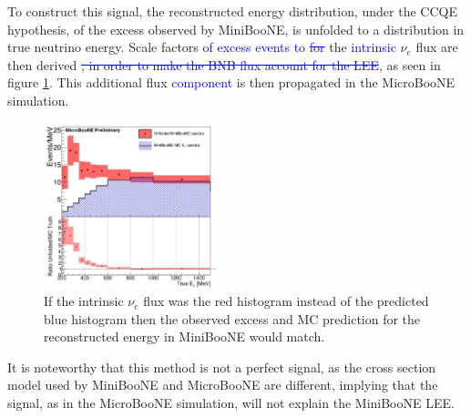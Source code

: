 \documentclass[a4paper]{article}
\newcommand{\nue}{$\nu_e$ }
\begin{document}
To construct this signal, the reconstructed energy distribution, under the CCQE hypothesis, of the excess observed by MiniBooNE, is unfolded to a distribution in true neutrino energy.
Scale factors \textcolor{blue}{of excess events to \st{for}} the \textcolor{blue}{intrinsic} \nue flux are then derived \textcolor{blue}{\st{, in order to make the BNB flux account for the LEE}}, as seen in figure \ref{fig:lee_unfolded_signal}.
This additional flux \textcolor{blue}{component} is then propagated in the MicroBooNE simulation.

\begin{figure}[]
    \begin{center}
    \includegraphics[width=0.45\textwidth]{Sensitivity/lee_unfolded_signal.png}
    \caption{If the intrinsic \nue flux was the red histogram instead of the predicted blue histogram then the observed excess and MC prediction for the reconstructed energy in MiniBooNE would match.}
    \label{fig:lee_unfolded_signal}
    \end{center}
\end{figure}

It is noteworthy that this method is not a perfect signal, as the cross section model used by MiniBooNE and MicroBooNE are different, implying that the signal, as in the MicroBooNE simulation, will not explain the MiniBooNE LEE.
\end{document}
